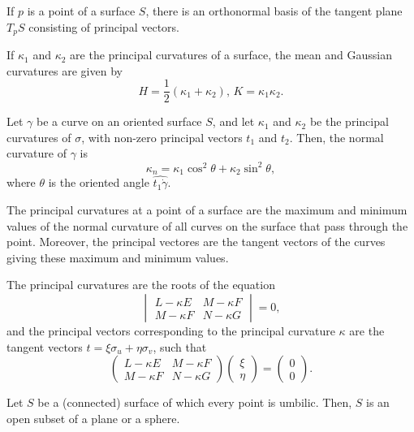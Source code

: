 \begin{corollary}
  If $p$ is a point of a surface $S$,
  there is an orthonormal basis of the tangent plane $T_p S$
  consisting of principal vectors.
\end{corollary}

\begin{proposition}
  If $\kappa_1$ and $\kappa_2$ are the principal curvatures of a surface,
  the mean and Gaussian curvatures are given by
  \[
    H = \frac{1}{2}(\kappa_1 + \kappa_2), \,
    K = \kappa_1 \kappa_2.
  \]
\end{proposition}

\begin{theorem}
  Let $\gamma$ be a curve on an oriented surface $S$,
  and let $\kappa_1$ and $\kappa_2$ be the principal curvatures of $\sigma$,
  with non-zero principal vectors $t_1$ and $t_2$.
  Then, the normal curvature of $\gamma$ is
  \[
    \kappa_n = \kappa_1 \cos^2 \theta + \kappa_2 \sin^2 \theta,  
  \]
  where $\theta$ is the oriented angle $\widehat{t_1 \dot{\gamma}}$.
\end{theorem}

\begin{corollary}
  The principal curvatures at a point of a surface are the maximum and minimum
  values of the normal curvature of all curves on the surface that pass through
  the point. Moreover, the principal vectores are the tangent vectors of the curves
  giving these maximum and minimum values.
\end{corollary}

\begin{proposition}
  The principal curvatures are the roots of the equation
  \[
    \begin{vmatrix}
      L - \kappa E & M - \kappa F \\
      M - \kappa F & N - \kappa G
    \end{vmatrix}
    = 0,
  \]
  and the principal vectors corresponding to the principal curvature $\kappa$
  are the tangent vectors $t = \xi \sigma_u + \eta \sigma_v$, such that
  \[
    \begin{pmatrix}
      L - \kappa E & M - \kappa F \\
      M - \kappa F & N - \kappa G
    \end{pmatrix}
    \begin{pmatrix}
      \xi \\
      \eta
    \end{pmatrix}
    =
    \begin{pmatrix}
      0 \\
      0
    \end{pmatrix}
    .
  \]
\end{proposition}

\begin{proposition}
  Let $S$ be a (connected) surface of which every point is umbilic.
  Then, $S$ is an open subset of a plane or a sphere.
\end{proposition}